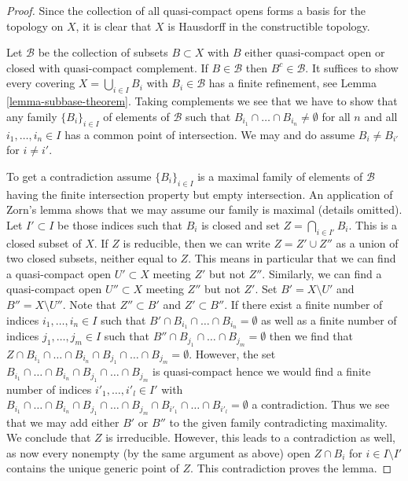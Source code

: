 \begin{proof}
Since the collection of all quasi-compact opens forms a basis for the
topology on $X$, it is clear that $X$ is Hausdorff in the constructible
topology.

\medskip\noindent
Let $\mathcal{B}$ be the collection of subsets $B \subset X$
with $B$ either quasi-compact open or closed with quasi-compact
complement. If $B \in \mathcal{B}$ then $B^c \in \mathcal{B}$.
It suffices to show every covering $X = \bigcup_{i \in I} B_i$
with $B_i \in \mathcal{B}$ has a finite refinement, see
Lemma \ref{lemma-subbase-theorem}.
Taking complements we see that we have to show that any family
$\{B_i\}_{i \in I}$ of elements of $\mathcal{B}$
such that $B_{i_1} \cap \ldots \cap B_{i_n} \not = \emptyset$
for all $n$ and all $i_1, \ldots, i_n \in I$
has a common point of intersection. We may and do assume
$B_i \not = B_{i'}$ for $i \not = i'$.

\medskip\noindent
To get a contradiction assume $\{B_i\}_{i \in I}$ is a maximal family
of elements of $\mathcal{B}$ having the finite intersection property
but empty intersection. An application of Zorn's lemma shows that we
may assume our family is maximal (details omitted).
Let $I' \subset I$ be those indices such that
$B_i$ is closed and set $Z = \bigcap_{i \in I'} B_i$. This is a closed
subset of $X$. If $Z$ is reducible, then we can write $Z = Z' \cup Z''$
as a union of two closed subsets, neither equal to $Z$. This means in
particular that we can find a quasi-compact open $U' \subset X$ meeting
$Z'$ but not $Z''$. Similarly, we can find a quasi-compact open
$U'' \subset X$ meeting $Z''$ but not $Z'$. Set $B' = X \setminus U'$ and
$B'' = X \setminus U''$. Note that $Z'' \subset B'$ and $Z' \subset B''$.
If there exist a finite number of indices $i_1, \ldots, i_n \in I$ such
that $B' \cap B_{i_1} \cap \ldots \cap B_{i_n} = \emptyset$
as well as a finite number of indices $j_1, \ldots, j_m \in I$ such that
$B'' \cap B_{j_1} \cap \ldots \cap B_{j_m} = \emptyset$
then we find that
$Z \cap B_{i_1} \cap \ldots \cap B_{i_n} \cap B_{j_1} \cap \ldots \cap B_{j_m}
= \emptyset$.
However, the set
$B_{i_1} \cap \ldots \cap B_{i_n} \cap B_{j_1} \cap \ldots \cap B_{j_m}$
is quasi-compact hence we would find a finite number of
indices $i'_1, \ldots, i'_l \in I'$ with
$B_{i_1} \cap \ldots \cap B_{i_n} \cap B_{j_1} \cap \ldots \cap
B_{j_m} \cap B_{i'_1} \cap \ldots \cap B_{i'_l} = \emptyset$ a contradiction.
Thus we see that we may add either $B'$ or $B''$ to the given family
contradicting maximality. We conclude that $Z$ is irreducible. However,
this leads to a contradiction as well, as now every nonempty (by the
same argument as above) open $Z \cap B_i$ for $i \in I \setminus I'$
contains the unique generic point of $Z$. This contradiction proves the lemma.
\end{proof}

